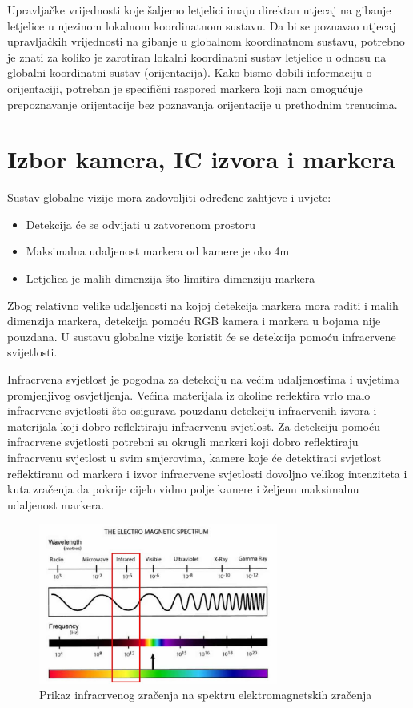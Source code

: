 \documentclass[times, utf8, diplomski]{fer}
\begin{document}
Upravljačke vrijednosti koje šaljemo letjelici imaju direktan utjecaj na gibanje letjelice u njezinom lokalnom koordinatnom sustavu. Da bi se poznavao utjecaj upravljačkih vrijednosti na gibanje u globalnom koordinatnom sustavu, potrebno je znati za koliko je zarotiran lokalni koordinatni sustav letjelice u odnosu na globalni koordinatni sustav (orijentacija). Kako bismo dobili informaciju o orijentaciji, potreban je specifični raspored markera koji nam omogućuje prepoznavanje orijentacije bez poznavanja orijentacije u prethodnim trenucima.

\section{Izbor kamera, IC izvora i markera}
Sustav globalne vizije mora zadovoljiti određene zahtjeve i uvjete:
\begin{itemize}
	\item Detekcija će se odvijati u zatvorenom prostoru
	\item Maksimalna udaljenost markera od kamere je oko 4m
	\item Letjelica je malih dimenzija što limitira dimenziju markera 
\end{itemize}
Zbog relativno velike udaljenosti na kojoj detekcija markera mora raditi i malih dimenzija markera, detekcija pomoću RGB kamera i markera u bojama nije pouzdana. U sustavu globalne vizije koristit će se detekcija pomoću infracrvene svijetlosti.

Infracrvena svjetlost je pogodna za detekciju na većim udaljenostima i uvjetima promjenjivog osvjetljenja. Većina materijala iz okoline reflektira vrlo malo infracrvene svjetlosti što osigurava pouzdanu detekciju infracrvenih izvora i materijala koji dobro reflektiraju infracrvenu svjetlost. Za detekciju pomoću infracrvene svjetlosti potrebni su okrugli markeri koji dobro reflektiraju infracrvenu svjetlost u svim smjerovima, kamere koje će detektirati svjetlost reflektiranu od markera i izvor infracrvene svjetlosti dovoljno velikog intenziteta i kuta zračenja da pokrije cijelo vidno polje kamere i željenu maksimalnu udaljenost markera.

\begin{figure}[h]
\centering
\includegraphics[width=0.7\textwidth]{infrared}
\caption{Prikaz infracrvenog zračenja na spektru elektromagnetskih zračenja}
\end{figure}
\end{document}
